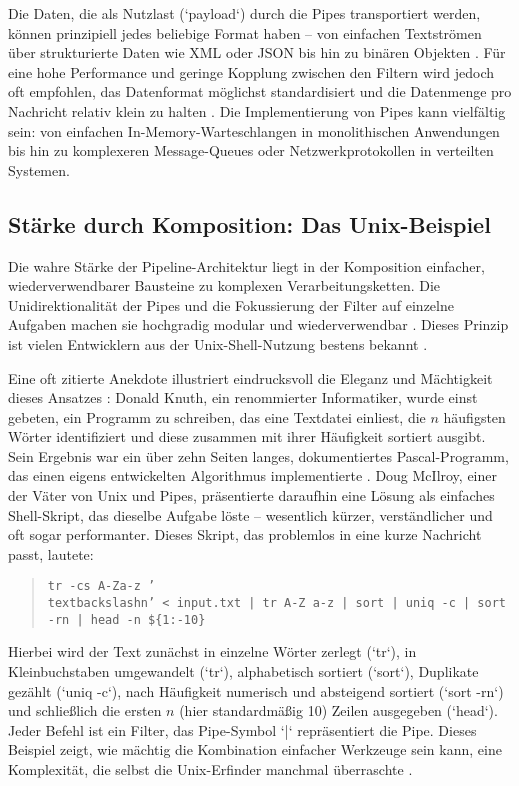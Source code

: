 \documentclass[11pt, a4paper]{article}
\begin{document}
Die Daten, die als Nutzlast (`payload`) durch die Pipes transportiert werden, können prinzipiell jedes beliebige Format haben – von einfachen Textströmen über strukturierte Daten wie XML oder JSON bis hin zu binären Objekten \cite{RichardsFord2020}. Für eine hohe Performance und geringe Kopplung zwischen den Filtern wird jedoch oft empfohlen, das Datenformat möglichst standardisiert und die Datenmenge pro Nachricht relativ klein zu halten \cite{RichardsFord2020}. Die Implementierung von Pipes kann vielfältig sein: von einfachen In-Memory-Warteschlangen in monolithischen Anwendungen bis hin zu komplexeren Message-Queues oder Netzwerkprotokollen in verteilten Systemen.

\subsection{Stärke durch Komposition: Das Unix-Beispiel}

Die wahre Stärke der Pipeline-Architektur liegt in der Komposition einfacher, wiederverwendbarer Bausteine zu komplexen Verarbeitungsketten. Die Unidirektionalität der Pipes und die Fokussierung der Filter auf einzelne Aufgaben machen sie hochgradig modular und wiederverwendbar \cite{RichardsFord2020}. Dieses Prinzip ist vielen Entwicklern aus der Unix-Shell-Nutzung bestens bekannt \cite{RichardsFord2020}.

Eine oft zitierte Anekdote illustriert eindrucksvoll die Eleganz und Mächtigkeit dieses Ansatzes \cite{RichardsFord2020}: Donald Knuth, ein renommierter Informatiker, wurde einst gebeten, ein Programm zu schreiben, das eine Textdatei einliest, die $n$ häufigsten Wörter identifiziert und diese zusammen mit ihrer Häufigkeit sortiert ausgibt. Sein Ergebnis war ein über zehn Seiten langes, dokumentiertes Pascal-Programm, das einen eigens entwickelten Algorithmus implementierte \cite{RichardsFord2020}. Doug McIlroy, einer der Väter von Unix und Pipes, präsentierte daraufhin eine Lösung als einfaches Shell-Skript, das dieselbe Aufgabe löste – wesentlich kürzer, verständlicher und oft sogar performanter. Dieses Skript, das problemlos in eine kurze Nachricht passt, lautete:
\begin{quote}
\texttt{tr -cs A-Za-z '\\textbackslash{}n' < input.txt | tr A-Z a-z | sort | uniq -c | sort -rn | head -n \$\{1:-10\}}
\end{quote}
Hierbei wird der Text zunächst in einzelne Wörter zerlegt (`tr`), in Kleinbuchstaben umgewandelt (`tr`), alphabetisch sortiert (`sort`), Duplikate gezählt (`uniq -c`), nach Häufigkeit numerisch und absteigend sortiert (`sort -rn`) und schließlich die ersten $n$ (hier standardmäßig 10) Zeilen ausgegeben (`head`). Jeder Befehl ist ein Filter, das Pipe-Symbol `|` repräsentiert die Pipe. Dieses Beispiel zeigt, wie mächtig die Kombination einfacher Werkzeuge sein kann, eine Komplexität, die selbst die Unix-Erfinder manchmal überraschte \cite{RichardsFord2020}.
\end{document}
